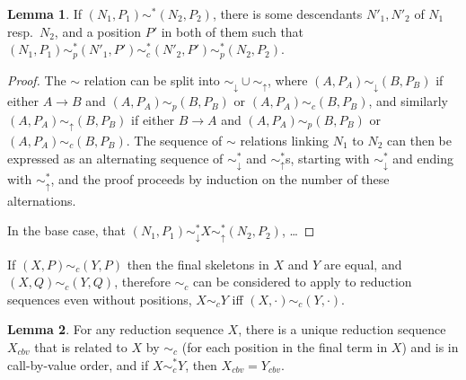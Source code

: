 \documentclass{article}
\theoremstyle{definition}
\theoremstyle{lemma}
\newtheorem{lemma}{Lemma}
\theoremstyle{remark}
\begin{document}
\begin{lemma} \label{downAcrossUp}
If $(N_1,P_1) \sim^* (N_2,P_2)$, there is some descendants $N'_1, N'_2$ of $N_1$ resp.~$N_2$, and a position $P'$ in both of them such that $(N_1,P_1) \sim_p^* (N'_1, P') \sim_c^* (N'_2, P') \sim_p^* (N_2, P_2)$.
\end{lemma}
\begin{proof}
The $\sim$ relation can be split into $\sim_\downarrow \cup \sim_\uparrow$, where $(A,P_A) \sim_\downarrow (B,P_B)$ if either $A \to B$ and $(A,P_A) \sim_p (B,P_B)$ or $(A,P_A) \sim_c (B,P_B)$, and similarly $(A,P_A) \sim_\uparrow (B,P_B)$ if either $B \to A$ and $(A,P_A) \sim_p (B,P_B)$ or $(A,P_A) \sim_c (B,P_B)$. The sequence of $\sim$ relations linking $N_1$ to $N_2$ can then be expressed as an alternating sequence of $\sim_\downarrow^*$ and $\sim_\uparrow^*$s, starting with $\sim_\downarrow^*$ and ending with $\sim_\uparrow^*$, and the proof proceeds by induction on the number of these alternations.

In the base case, that $(N_1,P_1) \sim_\downarrow^* X \sim_\uparrow^* (N_2,P_2)$, \dots

\end{proof}


If $(X,P) \sim_c (Y,P)$ then the final skeletons in $X$ and $Y$ are equal, and $(X,Q) \sim_c (Y,Q)$, therefore $\sim_c$ can be considered to apply to reduction sequences even without positions, $X \sim_c Y$ iff $(X,\cdot) \sim_c (Y,\cdot)$.

\begin{lemma} \label{canonicalCousins}
For any reduction sequence $X$, there is a unique reduction sequence $X_{cbv}$ that is related to $X$ by $\sim_c$ (for each position in the final term in $X$) and is in call-by-value order, and if $X \sim_c^* Y$, then $X_{cbv} = Y_{cbv}$.
\end{lemma}

\end{document}
